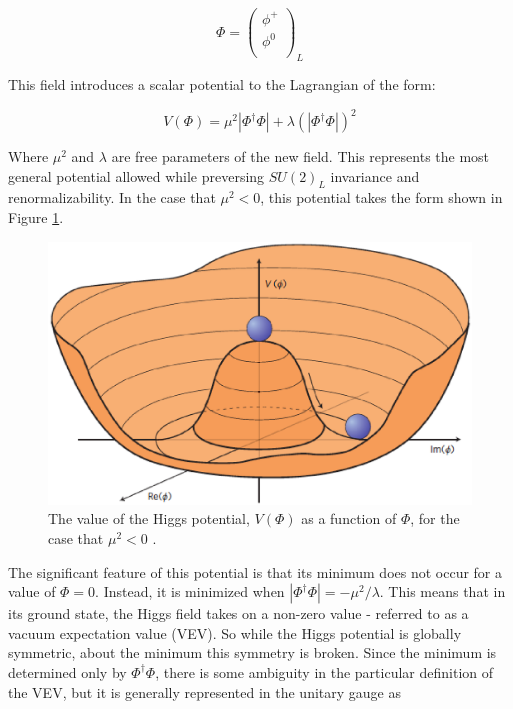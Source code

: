 \begin{equation}
  \label{eq:phiDoublet}
  \Phi = 
  \begin{pmatrix}                                                                                                           
    \phi^+ \\                                                                                                               
    \phi^0 \\                                                                                                                            
  \end{pmatrix}_L                                                                                                                    
\end{equation}

This field introduces a scalar potential to the Lagrangian of the form:

\begin{equation}
  \label{eq:higgsV}
  V(\Phi) = \mu^2|\Phi^\dagger\Phi| + \lambda (|\Phi^\dagger \Phi|)^2
\end{equation}

Where $\mu^2$ and $\lambda$ are free parameters of the new field. This represents the most general potential allowed while preversing $SU(2)_L$ invariance and renormalizability. In the case that $\mu^2 < 0$, this potential takes the form shown in Figure \ref{fig:higgspotential}.

\begin{figure}[H]
\centering
   \includegraphics[width=0.75\linewidth]{figures/theory/higgspotential.eps}
\caption{The value of the Higgs potential, $V(\Phi)$ as a function of $\Phi$, for the case that $\mu^2 < 0$ \cite{Ellis:1638469}.}
\label{fig:higgspotential}
\end{figure}

The significant feature of this potential is that its minimum does not occur for a value of $\Phi = 0$. Instead, it is minimized when $|\Phi^\dagger \Phi| = -\mu^2/\lambda$. This means that in its ground state, the Higgs field takes on a non-zero value - referred to as a vacuum expectation value (VEV). So while the Higgs potential is globally symmetric, about the minimum this symmetry is broken. Since the minimum is determined only by $\Phi^\dagger \Phi$, there is some ambiguity in the particular definition of the VEV, but it is generally represented in the unitary gauge as 

